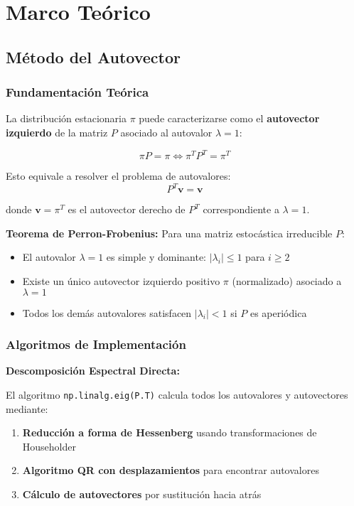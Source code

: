 \section{Marco Teórico}

\subsection{Método del Autovector}

\subsubsection{Fundamentación Teórica}

La distribución estacionaria $\pi$ puede caracterizarse como el \textbf{autovector izquierdo} de la matriz $P$ asociado al autovalor $\lambda = 1$:

\begin{equation}
\pi P = \pi \Leftrightarrow \pi^T P^T = \pi^T
\end{equation}

Esto equivale a resolver el problema de autovalores:
\begin{equation}
P^T \mathbf{v} = \mathbf{v}
\end{equation}

donde $\mathbf{v} = \pi^T$ es el autovector derecho de $P^T$ correspondiente a $\lambda = 1$.

\textbf{Teorema de Perron-Frobenius:} Para una matriz estocástica irreducible $P$:
\begin{itemize}
\item El autovalor $\lambda = 1$ es simple y dominante: $|\lambda_i| \leq 1$ para $i \geq 2$
\item Existe un único autovector izquierdo positivo $\pi$ (normalizado) asociado a $\lambda = 1$
\item Todos los demás autovalores satisfacen $|\lambda_i| < 1$ si $P$ es aperiódica
\end{itemize}

\subsubsection{Algoritmos de Implementación}

\textbf{Descomposición Espectral Directa:}

El algoritmo \texttt{np.linalg.eig(P.T)} calcula todos los autovalores y autovectores mediante:

\begin{enumerate}
\item \textbf{Reducción a forma de Hessenberg} usando transformaciones de Householder
\item \textbf{Algoritmo QR con desplazamientos} para encontrar autovalores
\item \textbf{Cálculo de autovectores} por sustitución hacia atrás
\end{enumerate}

